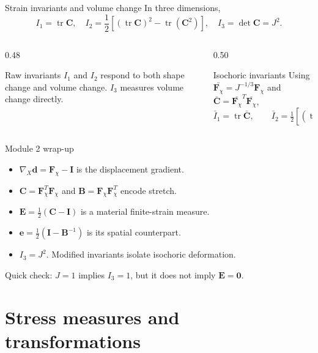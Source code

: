 \documentclass[aspectratio=169,11pt]{beamer}
\newcommand{\I}{\bm{I}}
\newcommand{\Fdef}{\bm{F}_{\chi}}
\newcommand{\Cten}{\bm{C}}
\newcommand{\Bten}{\bm{B}}
\newcommand{\Eten}{\bm{E}}
\newcommand{\eten}{\bm{e}}
\newcommand{\gradX}{\nabla_{\!X}}
\begin{document}
\begin{frame}{Strain invariants and volume change}
In three dimensions,
\[
  I_1=\operatorname{tr}\Cten,
  \quad
  I_2=\frac12\left[
    (\operatorname{tr}\Cten)^2-\operatorname{tr}(\Cten^2)
  \right],
  \quad
  I_3=\det\Cten=J^2.
\]
\begin{columns}[T,onlytextwidth]
\begin{column}{0.48\textwidth}
\begin{block}{Raw invariants}
\(I_1\) and \(I_2\) respond to both shape change and volume change. \(I_3\) measures volume change directly.
\end{block}
\end{column}
\begin{column}{0.50\textwidth}
\begin{block}{Isochoric invariants}
Using \(\bar{\Fdef}=J^{-1/3}\Fdef\) and
\(\bar{\Cten}=\bar{\Fdef}^T\bar{\Fdef}\),
\[
  \bar I_1=\operatorname{tr}\bar{\Cten},
  \qquad
  \bar I_2=\tfrac12[
    (\operatorname{tr}\bar{\Cten})^2
    -\operatorname{tr}(\bar{\Cten}^2)] .
\]
\end{block}
\end{column}
\end{columns}
\end{frame}

\begin{frame}{Module 2 wrap-up}
\begin{itemize}\itemsep6pt
  \item \(\gradX\bm{d}=\Fdef-\I\) is the displacement gradient.
  \item \(\Cten=\Fdef^T\Fdef\) and \(\Bten=\Fdef\Fdef^T\) encode stretch.
  \item \(\Eten=\tfrac12(\Cten-\I)\) is a material finite-strain measure.
  \item \(\eten=\tfrac12(\I-\Bten^{-1})\) is its spatial counterpart.
  \item \(I_3=J^2\). Modified invariants isolate isochoric deformation.
\end{itemize}
\medskip
\begin{punchbox}
\small
Quick check: \(J=1\) implies \(I_3=1\), but it does not imply \(\Eten=\bm{0}\).
\end{punchbox}
\end{frame}

\section{Stress measures and transformations}
\end{document}
